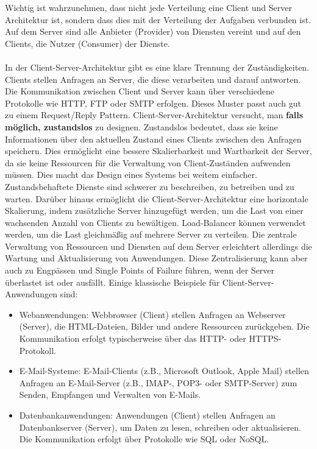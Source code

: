 Wichtig ist wahrzunehmen, dass nicht jede Verteilung eine Client und Server Architektur ist, sondern dass dies mit der Verteilung der Aufgaben verbunden ist. Auf dem Server sind alle Anbieter (Provider) von Diensten vereint und auf den Clients, die Nutzer (Consumer) der Dienste. 
\\\\
In der Client-Server-Architektur gibt es eine klare Trennung der Zuständigkeiten. Clients stellen Anfragen an Server, die diese verarbeiten und darauf antworten. Die Kommunikation zwischen Client und Server kann über verschiedene Protokolle wie HTTP, FTP oder SMTP erfolgen. Dieses Muster passt auch gut zu einem Request/Reply Pattern. 
Client-Server-Architektur versucht, man \textbf{falls möglich, zustandslos} zu designen. Zustandslos bedeutet, dass sie keine Informationen über den aktuellen Zustand eines Clients zwischen den Anfragen speichern. Dies ermöglicht eine bessere Skalierbarkeit und Wartbarkeit der Server, da sie keine Ressourcen für die Verwaltung von Client-Zuständen aufwenden müssen. Dies macht das Design eines Systems bei weitem einfacher. Zustandsbehaftete Dienste sind schwerer zu beschreiben, zu betreiben und zu warten. 
Darüber hinaus ermöglicht die Client-Server-Architektur eine horizontale Skalierung, indem zusätzliche Server hinzugefügt werden, um die Last von einer wachsenden Anzahl von Clients zu bewältigen. Load-Balancer können verwendet werden, um die Last gleichmäßig auf mehrere Server zu verteilen.
Die zentrale Verwaltung von Ressourcen und Diensten auf dem Server erleichtert allerdings die Wartung und Aktualisierung von Anwendungen. Diese Zentralisierung kann aber auch zu Engpässen und Single Points of Failure führen, wenn der Server überlastet ist oder ausfällt. Einige klassische Beispiele für Client-Server-Anwendungen sind:
\begin{itemize}
\item Webanwendungen: Webbrowser (Client) stellen Anfragen an Webserver (Server), die HTML-Dateien, Bilder und andere Ressourcen zurückgeben. Die Kommunikation erfolgt typischerweise über das HTTP- oder HTTPS-Protokoll.
\item E-Mail-Systeme: E-Mail-Clients (z.B., Microsoft Outlook, Apple Mail) stellen Anfragen an E-Mail-Server (z.B., IMAP-, POP3- oder SMTP-Server) zum Senden, Empfangen und Verwalten von E-Mails.
\item Datenbankanwendungen: Anwendungen (Client) stellen Anfragen an Datenbankserver (Server), um Daten zu lesen, schreiben oder aktualisieren. Die Kommunikation erfolgt über Protokolle wie SQL oder NoSQL.
\end{itemize}

